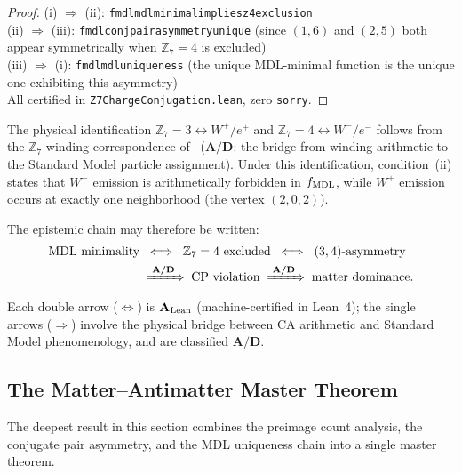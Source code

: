 \documentclass[11pt]{article}
\theoremstyle{remark}
\newcommand{\lean}[1]{%
  \penalty-100
  \begingroup\def\_{\textunderscore\allowbreak}\texttt{#1}\endgroup}
\newcommand{\CatAL}{\ensuremath{\textbf{A}_{\rm Lean}}}
\newcommand{\CatAD}{\textbf{A/D}}
\begin{document}
\begin{proof}
(i) $\Rightarrow$ (ii): \lean{fmdl\_mdl\_minimal\_implies\_z4\_exclusion}\\
(ii) $\Rightarrow$ (iii): \lean{fmdl\_conj\_pair\_asymmetry\_unique} (since $(1,6)$ and $(2,5)$ both appear symmetrically when $\mathbb{Z}_7=4$ is excluded)\\
(iii) $\Rightarrow$ (i): \lean{fmdl\_mdl\_uniqueness} (the unique MDL-minimal function is the unique one exhibiting this asymmetry)\\
All certified in \lean{Z7ChargeConjugation.lean}, zero \texttt{sorry}.
\end{proof}

The physical identification $\mathbb{Z}_7 = 3 \leftrightarrow W^+/e^+$ and
$\mathbb{Z}_7 = 4 \leftrightarrow W^-/e^-$ follows from the $\mathbb{Z}_7$ winding
correspondence of~\cite{Spivack2026_SM_UGP} ($\CatAD$: the bridge from winding arithmetic
to the Standard Model particle assignment).
Under this identification, condition~(ii) states that $W^-$ emission is
arithmetically forbidden in $f_{\rm MDL}$, while $W^+$ emission occurs at exactly one
neighborhood (the vertex $(2,0,2)$).

The epistemic chain may therefore be written:
\begin{align*}
\text{MDL minimality} &\;\iff\; \mathbb{Z}_7 = 4 \text{ excluded}
  \;\iff\; (3,4)\text{-asymmetry}\\
  &\;\xRightarrow{\;\CatAD\;}\; \text{CP violation}
  \;\xRightarrow{\;\CatAD\;}\; \text{matter dominance}.
\end{align*}
Each double arrow ($\iff$) is $\CatAL$ (machine-certified in Lean~4);
the single arrows ($\Rightarrow$) involve the physical bridge between CA arithmetic and
Standard Model phenomenology, and are classified $\CatAD$.

\subsection{The Matter--Antimatter Master Theorem}
\label{sec:cp_master}

The deepest result in this section combines the preimage count analysis, the conjugate pair
asymmetry, and the MDL uniqueness chain into a single master theorem.
\end{document}
